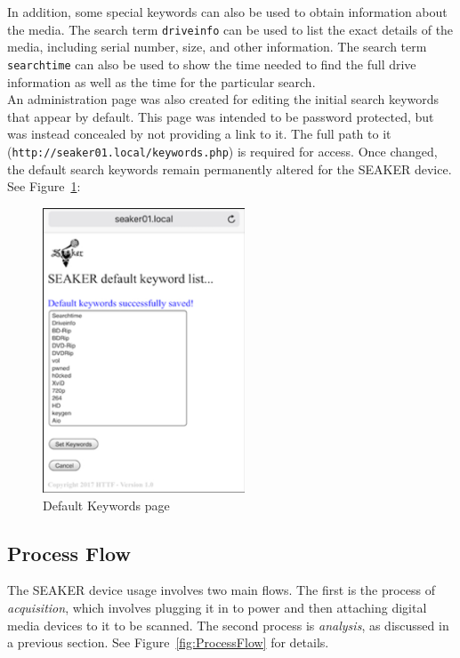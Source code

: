 \documentclass[12pt]{article}
\begin{document}
In addition, some special keywords can also be used to obtain information
about the media.  The search term \verb|driveinfo| can be used to list the exact details of
the media, including serial number, size, and other information.
The search term \verb|searchtime| can also be used to show the time needed to find the
full drive information as well as the time for the particular search.\\

An administration page was also created for editing the initial search keywords that 
appear by default.
This page was intended to be password protected, but was instead concealed by not
providing a link to it.  The full path to it ({\tt http://seaker01.local/keywords.php})
is required for access.  Once changed, the default search keywords remain permanently
altered for the SEAKER device.  See Figure~\ref{fig:DefaultKeywords}:\\

\begin{figure}[H]
  \begin{center}
  \includegraphics[width=6cm]{images/DefaultKeywords.png}
  \caption{Default Keywords page}
  \label{fig:DefaultKeywords}
  \end{center}
\end{figure}

\subsection{Process Flow}

The SEAKER device usage involves two main flows.  The first is the 
process of {\em acquisition}, which involves plugging it in to power
and then attaching digital media devices to it to be scanned.
The second process is {\em analysis}, as discussed in a
previous section.
See Figure~\ref{fig:ProcessFlow} for details.
\end{document}

